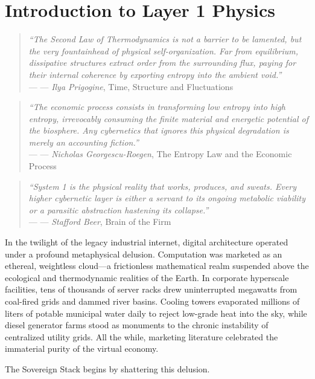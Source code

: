 \chapter{Introduction to Layer 1 Physics}
\label{chap:layer1_introduction}

\providecommand{\epigraph}[2]{%
  \begin{quote}
    \textit{#1} \\
    \raggedleft--- #2
  \end{quote}
}

\epigraph{
    ``The Second Law of Thermodynamics is not a barrier to be lamented, but the very fountainhead of physical self-organization. Far from equilibrium, dissipative structures extract order from the surrounding flux, paying for their internal coherence by exporting entropy into the ambient void.''
}{--- \textit{Ilya Prigogine}, \textnormal{Time, Structure and Fluctuations} \cite{prigogine1977time}}

\epigraph{
    ``The economic process consists in transforming low entropy into high entropy, irrevocably consuming the finite material and energetic potential of the biosphere. Any cybernetics that ignores this physical degradation is merely an accounting fiction.''
}{--- \textit{Nicholas Georgescu-Roegen}, \textnormal{The Entropy Law and the Economic Process} \cite{georgescu1971entropy}}

\epigraph{
    ``System 1 is the physical reality that works, produces, and sweats. Every higher cybernetic layer is either a servant to its ongoing metabolic viability or a parasitic abstraction hastening its collapse.''
}{--- \textit{Stafford Beer}, \textnormal{Brain of the Firm} \cite{beer1972brain}}

In the twilight of the legacy industrial internet, digital architecture operated under a profound metaphysical delusion. Computation was marketed as an ethereal, weightless cloud---a frictionless mathematical realm suspended above the ecological and thermodynamic realities of the Earth. In corporate hyperscale facilities, tens of thousands of server racks drew uninterrupted megawatts from coal-fired grids and dammed river basins. Cooling towers evaporated millions of liters of potable municipal water daily to reject low-grade heat into the sky, while diesel generator farms stood as monuments to the chronic instability of centralized utility grids. All the while, marketing literature celebrated the immaterial purity of the virtual economy.

The Sovereign Stack begins by shattering this delusion.

